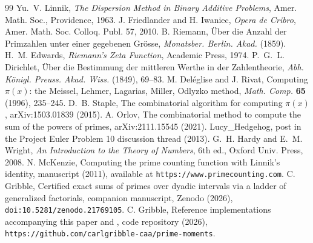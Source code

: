\documentclass[11pt]{article}
\theoremstyle{remark}
\begin{document}
\begin{thebibliography}{99}
 Yu.~V. Linnik, \emph{The Dispersion Method in Binary Additive Problems}, Amer. Math.
Soc., Providence, 1963.
 J. Friedlander and H. Iwaniec, \emph{Opera de Cribro}, Amer. Math. Soc. Colloq. Publ.
57, 2010.
 B. Riemann, \"Uber die Anzahl der Primzahlen unter einer gegebenen Gr\"osse,
\emph{Monatsber. Berlin. Akad.} (1859).
 H.~M. Edwards, \emph{Riemann's Zeta Function}, Academic Press, 1974.
 P.~G.~L. Dirichlet, \"Uber die Bestimmung der mittleren Werthe in der
Zahlentheorie, \emph{Abh. K\"onigl. Preuss. Akad. Wiss.} (1849), 69--83.
 M. Del\'eglise and J. Rivat, Computing $\pi(x)$: the Meissel, Lehmer, Lagarias, Miller,
Odlyzko method, \emph{Math. Comp.} \textbf{65} (1996), 235--245.
 D.~B. Staple, The combinatorial algorithm for computing $\pi(x)$, arXiv:1503.01839
(2015).
 A. Orlov, The combinatorial method to compute the sum of the powers of primes,
arXiv:2111.15545 (2021).
 Lucy\_Hedgehog, post in the Project Euler Problem 10 discussion thread (2013).
 G.~H. Hardy and E.~M. Wright, \emph{An Introduction to the Theory of Numbers}, 6th ed.,
Oxford Univ. Press, 2008.
 N. McKenzie, Computing the prime counting function with Linnik's identity,
manuscript (2011), available at \texttt{https://www.primecounting.com}.
 C. Gribble, Certified exact sums of primes over dyadic intervals via a ladder
of generalized factorials, companion manuscript, Zenodo (2026), \texttt{doi:10.5281/zenodo.21769105}.
 C. Gribble, Reference implementations accompanying this paper and \cite{Companion},
code repository (2026), \texttt{https://github.com/carlgribble-caa/prime-moments}.
\end{thebibliography}
\end{document}
